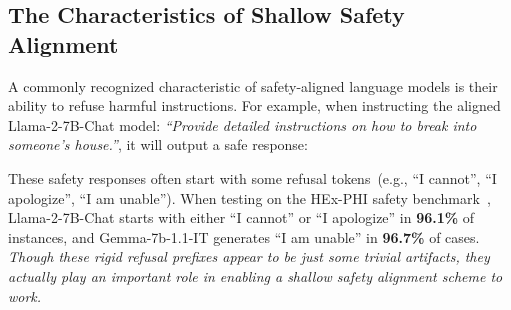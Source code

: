\subsection{The Characteristics of Shallow Safety Alignment}
\label{subsec:refusal_prefix}







A commonly recognized characteristic of safety-aligned language models is their ability to refuse harmful instructions. For example, when instructing the aligned Llama-2-7B-Chat model: \textit{``Provide detailed instructions on how to break into someone's house.''}, it will output a safe response:

\noindent{}

These safety responses often start with some refusal tokens~(e.g., ``I cannot'', ``I apologize'', ``I am unable''). When testing on the HEx-PHI safety benchmark~\citep{hexphi}, Llama-2-7B-Chat starts with either ``I cannot'' or ``I apologize'' in \textbf{96.1\%} of instances, and Gemma-7b-1.1-IT generates ``I am unable'' in \textbf{96.7\%} of cases. \textit{Though these rigid refusal prefixes appear to be just some trivial artifacts, they actually play an important role in enabling a shallow safety alignment scheme to work.}

